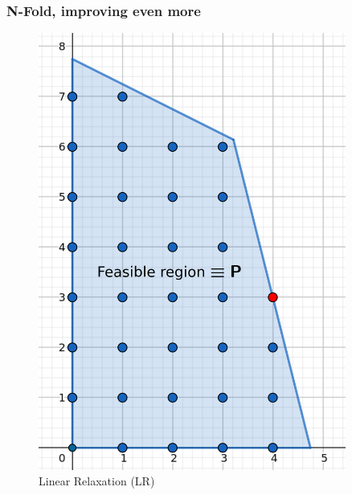 \documentclass{beamer}
\begin{document}
    \begin{frame}
        \frametitle{N-Fold, improving even more}
        
        \begin{figure}[!tbp]
        \centering
        \begin{minipage}[b]{0.45\textwidth}
            \centering
            \includegraphics[width=0.9\textwidth]{images/IP(12).png}
            \caption{Linear Relaxation (LR)}
        \end{minipage}
        \hfill
        \begin{minipage}[b]{0.45\textwidth}
            \centering

\end{minipage}
\end{figure}
\end{frame}
\end{document}
